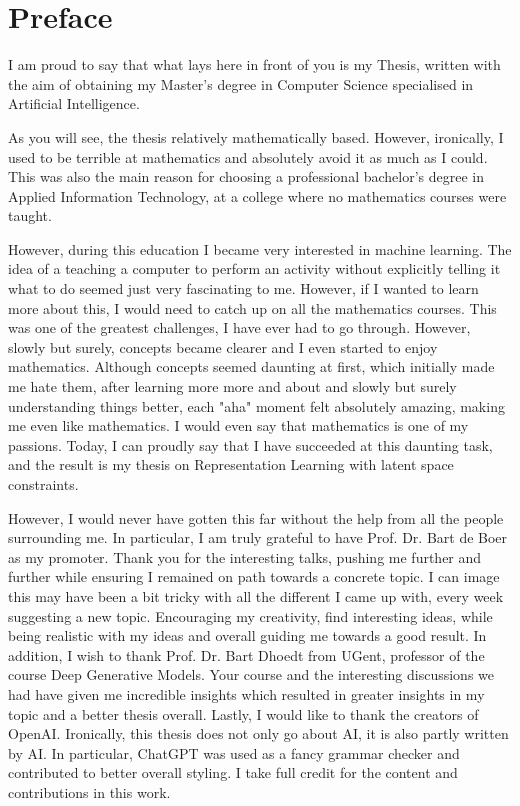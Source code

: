 \chapter*{Preface}

I am proud to say that what lays here in front of you is my Thesis, written with the aim of obtaining my Master's degree in Computer Science specialised in Artificial Intelligence.


As you will see, the thesis relatively mathematically based. However, ironically, I used to be terrible at mathematics and absolutely avoid it as much as I could. This was also the main reason for choosing a professional bachelor's degree in Applied Information Technology, at a college where no mathematics courses were taught. 

However, during this education I became very interested in machine learning. The idea of a teaching a computer to perform an activity without explicitly telling it what to do seemed just very fascinating to me. However, if I wanted to learn more about this, I would need to catch up on all the mathematics courses. This was one of the greatest challenges, I have ever had to go through. However, slowly but surely, concepts became clearer and I even started to enjoy mathematics. Although concepts seemed daunting at first, which initially made me hate them, after learning more more and about and slowly but surely understanding things better, each "aha" moment felt absolutely amazing, making me even like mathematics. I would even say that mathematics is one of my passions. Today, I can proudly say that I have succeeded at this daunting task, and the result is my thesis on Representation Learning with latent space constraints.


However, I would never have gotten this far without the help from all the people surrounding me. In particular, I am truly grateful to have Prof. Dr. Bart de Boer as my promoter. Thank you for the interesting talks, pushing me further and further while ensuring I remained on path towards a concrete topic. I can image this may have been a bit tricky with all the different I came up with, every week suggesting a new topic. Encouraging my creativity, find interesting ideas, while being realistic with my ideas and overall guiding me towards a good result. In addition, I wish to thank Prof. Dr. Bart Dhoedt from UGent, professor of the course Deep Generative Models. Your course and the interesting discussions we had have given me incredible insights which resulted in greater insights in my topic and a better thesis overall. Lastly, I would like to thank the creators of OpenAI. Ironically, this thesis does not only go about AI, it is also partly written by AI. In particular, ChatGPT was used as a fancy grammar checker and contributed to better overall styling. I take full credit for the content and contributions in this work.

 
